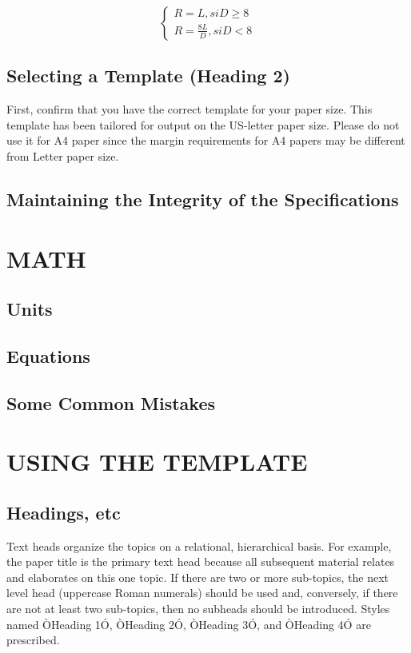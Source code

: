 \documentclass[letterpaper, 10 pt,spanish, conference]{ieeeconf}  %
\begin{document}
    $$\begin{cases}
	R = L,  si D\ge8\\ 
	R = \frac{8L}{D},  si D<8 
	\end{cases}$$

\subsection{Selecting a Template (Heading 2)}

First, confirm that you have the correct template for your paper size. This template has been tailored for output on the US-letter paper size. Please do not use it for A4 paper since the margin requirements for A4 papers may be different from Letter paper size.

\subsection{Maintaining the Integrity of the Specifications}


\section{MATH}


\subsection{Units}

\subsection{Equations}


\subsection{Some Common Mistakes}

\section{USING THE TEMPLATE}

\subsection{Headings, etc}

Text heads organize the topics on a relational, hierarchical basis. For example, the paper title is the primary text head because all subsequent material relates and elaborates on this one topic. If there are two or more sub-topics, the next level head (uppercase Roman numerals) should be used and, conversely, if there are not at least two sub-topics, then no subheads should be introduced. Styles named ÒHeading 1Ó, ÒHeading 2Ó, ÒHeading 3Ó, and ÒHeading 4Ó are prescribed.
\end{document}
